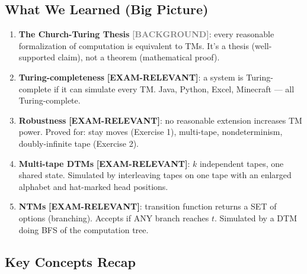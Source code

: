 \documentclass[11pt,a4paper]{article}
\newcommand{\kemark}{\textcolor{red!70!black}{\textbf{[EXAM-RELEVANT]}}}
\newcommand{\kbg}{\textcolor{gray}{\textbf{[BACKGROUND]}}}
\begin{document}
\subsection{What We Learned (Big Picture)}

\begin{enumerate}
\item \textbf{The Church-Turing Thesis} \kbg{}: every reasonable formalization of computation is equivalent to TMs. It's a thesis (well-supported claim), not a theorem (mathematical proof).

\item \textbf{Turing-completeness} \kemark{}: a system is Turing-complete if it can simulate every TM. Java, Python, Excel, Minecraft --- all Turing-complete.

\item \textbf{Robustness} \kemark{}: no reasonable extension increases TM power. Proved for: stay moves (Exercise 1), multi-tape, nondeterminism, doubly-infinite tape (Exercise 2).

\item \textbf{Multi-tape DTMs} \kemark{}: $k$ independent tapes, one shared state. Simulated by interleaving tapes on one tape with an enlarged alphabet and hat-marked head positions.

\item \textbf{NTMs} \kemark{}: transition function returns a SET of options (branching). Accepts if ANY branch reaches $t$. Simulated by a DTM doing BFS of the computation tree.
\end{enumerate}

\subsection{Key Concepts Recap}
\end{document}
